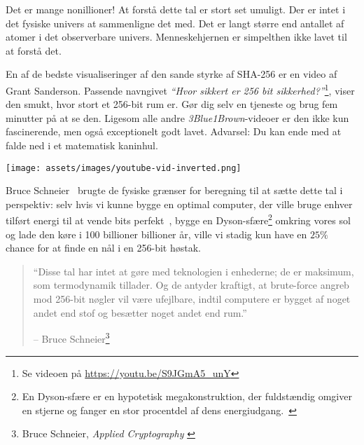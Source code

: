 Det er mange nonillioner! At forstå dette tal er stort set umuligt. Der er
intet i det fysiske univers at sammenligne det med. Det er langt større end 
antallet af atomer i det observerbare univers. Menneskehjernen er simpelthen 
ikke lavet til at forstå det.

\newpage

En af de bedste visualiseringer af den sande styrke af SHA-256 er en video af 
Grant Sanderson. Passende navngivet \textit{\enquote{Hvor sikkert er 256 bit 
sikkerhed?}}\footnote{Se videoen på \url{https://youtu.be/S9JGmA5_unY}}, 
viser den smukt, hvor stort et 256-bit rum er. Gør dig selv en tjeneste og 
brug fem minutter på at se den. Ligesom alle andre \textit{3Blue1Brown}-videoer 
er den ikke kun fascinerende, men også exceptionelt godt lavet. Advarsel: 
Du kan ende med at falde ned i et matematisk kaninhul.

\begin{center}
  \texttt{[image: assets/images/youtube-vid-inverted.png]}
  \label{fig:youtube-vid-inverted}
\end{center}

Bruce Schneier~\cite{web:schneier} brugte de fysiske grænser for beregning til 
at sætte dette tal i perspektiv: selv hvis vi kunne bygge en optimal computer, 
der ville bruge enhver tilført energi til at vende bits 
perfekt~\cite{wiki:landauer}, bygge en Dyson-sfære\footnote{En Dyson-sfære er 
en hypotetisk megakonstruktion, der fuldstændig omgiver en stjerne og fanger 
en stor procentdel af dens energiudgang.~\cite{wiki:dyson}} omkring vores sol 
og lade den køre i 100 billioner billioner år, ville vi stadig kun have en 
$25\%$ chance for at finde en nål i en 256-bit høstak.

\begin{quotation}\begin{samepage}
  \enquote{Disse tal har intet at gøre med teknologien i enhederne;
  de er maksimum, som termodynamik tillader. Og
  de antyder kraftigt, at brute-force angreb mod 256-bit nøgler vil være
  ufejlbare, indtil computere er bygget af noget andet end stof
  og besætter noget andet end rum.}
  \begin{flushright} -- Bruce Schneier\footnote{Bruce Schneier, 
    \textit{Applied Cryptography} \cite{bruce-schneier}}
  \end{flushright}\end{samepage}\end{quotation}
  
